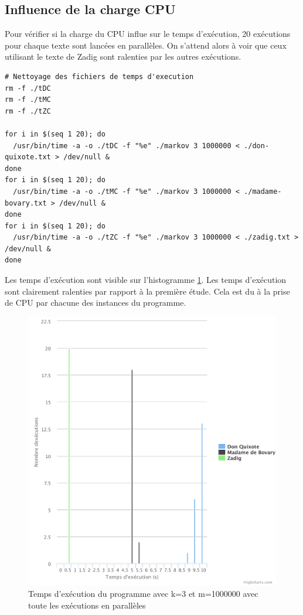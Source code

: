 \documentclass[10pt, a4paper]{article}
\begin{document}
\subsection{Influence de la charge CPU}

Pour vérifier si la charge du CPU influe sur le temps d'exécution, 20
exécutions pour chaque texte sont lancées en parallèles. On s'attend alors à
voir que ceux utilisant le texte de Zadig sont ralenties par les autres
exécutions. \\

\begin{verbatim}
# Nettoyage des fichiers de temps d'execution
rm -f ./tDC
rm -f ./tMC
rm -f ./tZC

for i in $(seq 1 20); do
  /usr/bin/time -a -o ./tDC -f "%e" ./markov 3 1000000 < ./don-quixote.txt > /dev/null &
done
for i in $(seq 1 20); do
  /usr/bin/time -a -o ./tMC -f "%e" ./markov 3 1000000 < ./madame-bovary.txt > /dev/null &
done
for i in $(seq 1 20); do
  /usr/bin/time -a -o ./tZC -f "%e" ./markov 3 1000000 < ./zadig.txt > /dev/null &
done
\end{verbatim}

Les temps d'exécution sont visible sur l'histogramme
\ref{fig:chart_k3_m1000000_para}. Les temps d'exécution sont clairement
ralenties par rapport à la première étude. Cela est du à la prise de CPU par
chacune des instances du programme. \\

\begin{figure}[ht]
    \centering
    \includegraphics[width=1.0\textwidth]{chart_k3_m1000000_para}
    \caption{Temps d'exécution du programme avec k=3 et m=1000000 avec toute les exécutions en parallèles}
    \label{fig:chart_k3_m1000000_para}
\end{figure}
\end{document}
